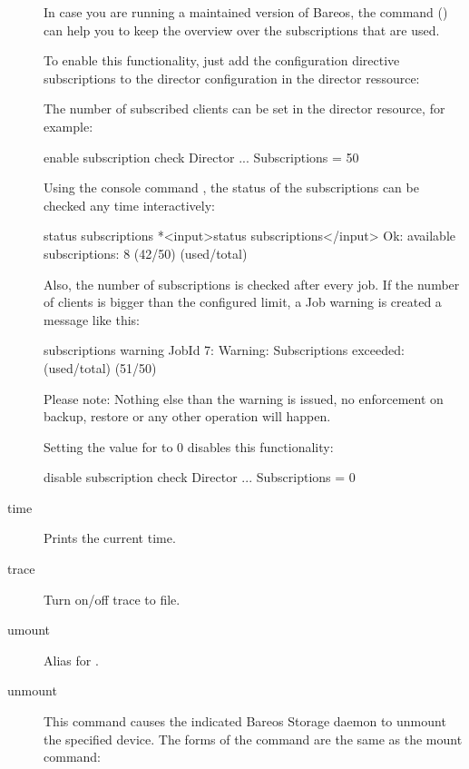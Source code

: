 \begin{description}
In case you are running a maintained version of Bareos,
the command  () can help you to keep the overview over the subscriptions
that are used.

To enable this functionality, just add the configuration directive subscriptions to the director configuration in the director ressource:

The number of subscribed clients can be set in
the director resource, for example:
\begin{bconfig}{enable subscription check}
Director {
   ...
   Subscriptions = 50
}
\end{bconfig}

Using the console command , the status of
the subscriptions can be checked any time interactively:

\begin{bconsole}{status subscriptions}
*<input>status subscriptions</input>
Ok: available subscriptions: 8 (42/50) (used/total)
\end{bconsole}

Also, the number of subscriptions is checked after every job.
If the number of clients is bigger than the configured limit, a Job warning is
created a message like this:
\begin{bconsole}{subscriptions warning}
JobId 7: Warning: Subscriptions exceeded: (used/total) (51/50)
\end{bconsole}

Please note: Nothing else than the warning is issued, no enforcement on
backup, restore or any other operation will happen.

Setting the value for  to 0 disables this functionality:
\begin{bconfig}{disable subscription check}
Director {
   ...
   Subscriptions = 0
}
\end{bconfig}


\item [time]
   Prints the current time.

\item [trace]
   Turn on/off trace to file.

\item [umount]
   Alias for .

\item [unmount]
   This command causes the indicated Bareos Storage  daemon to unmount the
   specified device. The forms of the command  are the same as the mount command:


\end{description}
